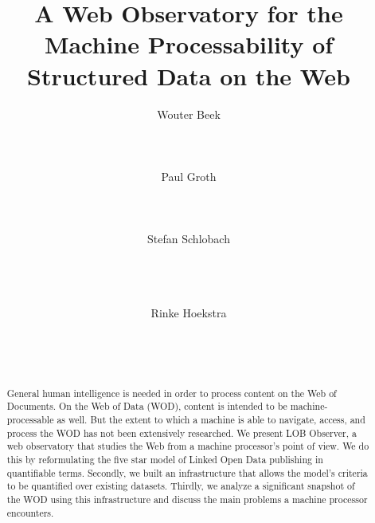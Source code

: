 \documentclass{acm_proc_article-sp}
\newcommand{\obs}{LOB Observer}
\begin{document}
\title{
  A Web Observatory for the Machine Processability of
   Structured Data on the Web
}


\author{
\alignauthor
  Wouter Beek\\
  \\
  \\
  \\
\alignauthor
  Paul Groth\\
  \\
  \\
  \\
\alignauthor
  Stefan Schlobach\\
  \\
  \\
  \\
\and
\alignauthor
  Rinke Hoekstra\\
  \\
  \\
  \\
}

\maketitle
\begin{abstract}
General human intelligence is needed in order to process content
 on the Web of Documents.
On the Web of Data (WOD), content is intended to be
 machine-processable as well.
But the extent to which a machine is able to navigate, access,
 and process the WOD has not been extensively researched.
We present \obs, a web observatory that studies the Web
 from a machine processor's point of view.
We do this by reformulating the five star model
 of Linked Open Data publishing
 in quantifiable terms.
Secondly, we built an infrastructure that allows
 the model's criteria to be quantified over existing datasets.
Thirdly, we analyze a significant snapshot of the WOD
 using this infrastructure and discuss the main problems
 a machine processor encounters.
\end{abstract}
\end{document}
